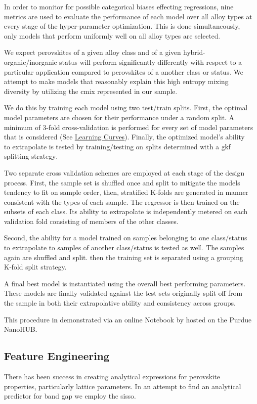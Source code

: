 \documentclass[aip, jmp, amsmath, amssymb, nofootinbib]{revtex4-2}
\begin{document}
In order to monitor for possible categorical biases effecting
regressions, nine metrics are used to evaluate the performance of each
model over all alloy types at every stage of the hyper-parameter
optimization. This is done simultaneously, only models that perform
uniformly well on all alloy types are selected.

We expect perovskites of a given alloy class and of a given
hybrid-organic/inorganic status will perform significantly differently
with respect to a particular application compared to perovskites of a
another class or status. We attempt to make models that reasonably
explain this high entropy mixing diversity by utilizing the \gls{cmix} represented in our sample.

We do this by training each model using two test/train splits. First,
the optimal model parameters are chosen for their performance under a
random split. A minimum of 3-fold cross-validation is performed for
every set of model parameters that is considered (See \hyperref[sec:org35444de]{Learning Curves}). Finally, the optimized model's ability to extrapolate is
tested by training/testing on splits determined with a \gls{gkf} splitting strategy.

Two separate cross validation schemes are employed at each stage of
the design process. First, the sample set is shuffled once and split
to mitigate the models tendency to fit on sample order, then,
stratified K-folds are generated in manner consistent with the types
of each sample. The regressor is then trained on the subsets of each
class. Its ability to extrapolate is independently metered on each
validation fold consisting of members of the other classes.

Second, the ability for a model trained on samples belonging to one
class/status to extrapolate to samples of another class/status is
tested as well. The samples again are shuffled and split. then the
training set is separated using a grouping K-fold split strategy.

A final best model is instantiated using the overall best performing
parameters. These models are finally validated against the test sets
originally split off from the sample in both their extrapolative
ability and consistency across groups.

This procedure in demonstrated via an online Notebook by
\citet{manganaris-2022-mrs-comput} hosted on the Purdue NanoHUB.

\subsection*{Feature Engineering}
\label{sec:org08692e3}
There has been success in creating analytical expressions for
perovskite properties, particularly lattice
parameters\cite{jiang-2006-predic-lattic}. In an attempt to find an
analytical predictor for band gap we employ the \Acrfull{sisso}\cite{ouyang-2018-sisso}.
\end{document}
